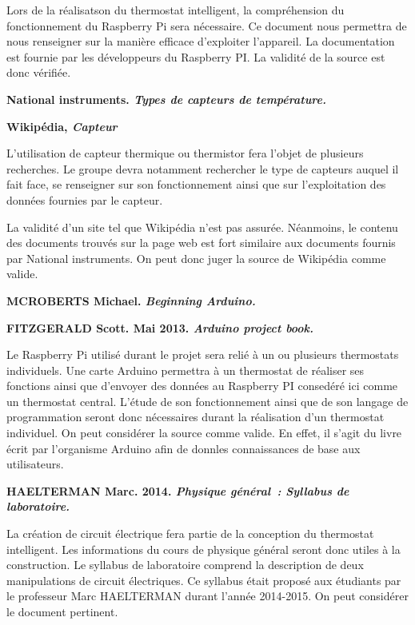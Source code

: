 \documentclass[12pt]{report}
\begin{document}
Lors de la r\'{e}alisatson du thermostat intelligent, la compr\'{e}hension du
fonctionnement du Raspberry Pi sera n\'{e}cessaire.  Ce document nous permettra
de nous renseigner sur la mani\`{e}re efficace d'exploiter l'appareil. La
documentation est fournie par les d\'{e}veloppeurs du Raspberry PI. La
validit\'{e} de la source est donc v\'{e}rifi\'{e}e.
\vspace*{1cm}

\textbf{National instruments. \textit{Types de capteurs de temp\'{e}rature. }} \cite{_types_????}


\textbf{Wikip\'{e}dia,\textit{ Capteur}} \cite{_capteur_2015}

L'utilisation de capteur thermique ou thermistor fera l'objet de plusieurs
recherches. Le groupe devra notamment rechercher le type de capteurs auquel il
fait face, se renseigner sur son fonctionnement ainsi que sur l'exploitation des
donn\'{e}es fournies par le capteur.


La validit\'{e} d'un site tel que Wikip\'{e}dia n'est pas assur\'{e}e.
N\'{e}anmoins, le contenu des documents trouv\'{e}s sur la page web est fort
similaire aux documents fournis par National instruments. On peut donc juger la source de
Wikip\'{e}dia comme valide.

\vspace*{1cm}
\textbf{MCROBERTS Michael. \textit{Beginning Arduino.}} \cite{mcroberts_michael_beginning_2013}


\textbf{FITZGERALD Scott. Mai 2013.  \textit{Arduino project book.}}\cite{_arduino_2013}
\vspace*{1cm}


 Le Raspberry Pi utilis\'{e} durant le projet sera reli\'{e} \`{a} un ou
plusieurs thermostats individuels. Une carte Arduino permettra \`{a} un
thermostat de r\'{e}aliser ses fonctions ainsi que d'envoyer des donn\'{e}es au
Raspberry PI  consed\'{e}r\'{e} ici comme un thermostat central. L'\'{e}tude
de son fonctionnement ainsi que de son langage de programmation seront donc
n\'{e}cessaires durant la r\'{e}alisation d'un thermostat individuel.
On peut considérer la source comme valide. En effet, il s'agit du livre écrit par l'organisme Arduino afin de donnles connaissances de base aux utilisateurs.

\vspace*{1cm}
\textbf{HAELTERMAN Marc. 2014.\textit{ Physique g\'{e}n\'{e}ral~: Syllabus de
laboratoire.}} \cite{haelterman_marc_physique_2014}

La cr\'{e}ation de circuit \'{e}lectrique fera partie de la conception du
thermostat intelligent. Les informations du cours de physique g\'{e}n\'{e}ral
seront donc utiles \`{a} la construction. Le syllabus de laboratoire comprend la
description de deux manipulations de circuit \'{e}lectriques.
Ce syllabus était proposé aux étudiants par le professeur Marc HAELTERMAN durant l'année 2014-2015. On peut considérer le document pertinent.
\end{document}
